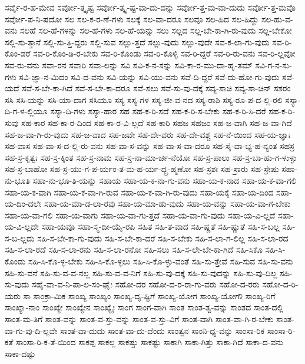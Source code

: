 {ಸರ್ವೈ-ರ-ಹ-ಮೇವ
ಸರ್ವೋ-ತ್ಕೃಷ್ಟ
ಸರ್ವೋ-ತ್ಕೃ-ಷ್ಟ-ವಾ-ದು-ದನ್ನು
ಸರ್ವೋ-ತ್ತ-ಮ-ವಾ-ದುದು
ಸರ್ವೋ-ತ್ತ-ಮವೊ
ಸರ್ವೋ-ಪ-ನಿ-ಷದೋ
ಸಲ
ಸಲ-ಕ-ರ-ಣೆ-ಗಳು
ಸಲಕ್ಕೆ
ಸಲ-ವಾ-ದರೂ
ಸಲವೂ
ಸಲ-ಹಿದ
ಸಲ-ಹಿದ್ದು
ಸಲ-ಹು-ವ-ವನು
ಸಲಹೆ
ಸಲ-ಹೆ-ಗಳನ್ನು
ಸಲ-ಹೆ-ಗಳು
ಸಲ-ಹೆ-ಯನ್ನು
ಸಲು
ಸಲ್ಲದ
ಸಲ್ಲ-ಬೇ-ಕಾ-ಗಿ-ರು-ವುದು
ಸಲ್ಲ-ಬೇಕೋ
ಸಲ್ಲಿ-ಸು-ತ್ತಾನೆ
ಸಲ್ಲಿ-ಸು-ತ್ತಿ-ದ್ದರು
ಸಲ್ಲಿ-ಸುವ
ಸಲ್ಲು-ತ್ತದೆ
ಸಲ್ಲು-ವುದು
ಸಲ್ಲು-ವುದೇ
ಸವ-ಕ-ಲಾ-ಗು-ವುದು
ಸವ-ರಿ-ಕೊಂ-ಡರೆ
ಸವ-ರಿ-ಕೊಂ-ಡಿ-ರ-ಬೇಕು
ಸವ-ರಿ-ಕೊಂಡು
ಸವ-ರಿ-ಕೊಳ್ಳಿ
ಸವ-ರಿ-ದ್ದರೆ
ಸವ-ರಿ-ರು-ವನು
ಸವ-ರಿ-ಲ್ಲವೋ
ಸವ-ರು-ವನು
ಸವಾ-ರನ
ಸವಾರಿ
ಸವಾ-ಲನ್ನು
ಸವಿ
ಸವಿ-ಕ-ನ-ಸನ್ನು
ಸವಿ-ಕಾ-ರ-ಮು-ದಾ-ಹೃ-ತಮ್
ಸವಿ-ಗ-ನ-ಸು-ಗಳು
ಸವಿ-ಜ್ಞಾ-ನ-ಮಿದಂ
ಸವಿ-ದ-ವನು
ಸವಿ-ಯನ್ನು
ಸವಿ-ಯು-ವನು
ಸವೆ-ದಿ-ದ್ದರೆ
ಸವೆ-ದು-ಹೋ-ಗು-ವುದು
ಸವೆ-ಯದೆ
ಸವೆ-ಸ-ಬೇ-ಕಾ-ಗಿದೆ
ಸವೆ-ಸ-ಬೇ-ಕಾ-ದರೂ
ಸವೆ-ಸಲು
ಸವೆ-ಸು-ವು-ದಕ್ಕೆ
ಸವ್ಯ-ಸಾಚಿ
ಸವ್ಯ-ಸಾ-ಚಿನ್
ಸಶರಂ
ಸಸಿ
ಸಸಿ-ಯನ್ನು
ಸಸಿ-ಯಾ-ದಾಗ
ಸಸಿಯೂ
ಸಸ್ಯ
ಸಸ್ಯ-ಗಳ
ಸಸ್ಯ-ಜೀ-ವ-ನದ
ಸಸ್ಯ-ರಾಶಿ
ಸಸ್ಯ-ರೂ-ಪ-ದ-ಲ್ಲಿ-ರಲಿ
ಸಸ್ಯಾ-ದಿ-ಗ-ಳ-ಲ್ಲಿಯೂ
ಸಸ್ಯಾ-ದಿ-ಗಳು
ಸಸ್ಯಾ-ಹಾರ
ಸಹ
ಸಹ-ಕ-ರಿ-ಸದೆ
ಸಹ-ಕ-ರಿ-ಸ-ಬೇಕು
ಸಹ-ಕ-ರಿ-ಸಿ-ದರೆ
ಸಹ-ಕ-ರಿ-ಸುವು
ಸಹ-ಕಾರ
ಸಹ-ಕಾ-ರ-ದಿಂದ
ಸಹ-ಕಾ-ರ-ವಿ-ಲ್ಲದೆ
ಸಹ-ಕಾರಿ
ಸಹಜ
ಸಹಜಂ
ಸಹ-ಜ-ವಾಗಿ
ಸಹ-ಜ-ವಾ-ಗಿದೆ
ಸಹ-ಜ-ವಾ-ಗಿ-ರು-ವುದು
ಸಹ-ಜ-ವಾದ
ಸಹ-ಜವೇ
ಸಹ-ದೇ-ವರು
ಸಹ-ದೇ-ವಶ್ಚ
ಸಹ-ನೆ-ಯಿಂದ
ಸಹ-ಯ-ಜ್ಞಾಃ
ಸಹ-ವಾಸ
ಸಹ-ವಾ-ಸ-ದ-ಲ್ಲಿ-ರು-ವನು
ಸಹ-ವಾ-ಸ-ವನ್ನು
ಸಹ-ವಾ-ಸ-ವಾ-ದರೂ
ಸಹ-ಸೈ-ವಾ-ಭ್ಯ-ಹ-ನ್ಯಂತ
ಸಹಸ್ರ
ಸಹ-ಸ್ರ-ಕೃತ್ವಃ
ಸಹ-ಸ್ರ-ಕ್ಕಿಂತ
ಸಹ-ಸ್ರ-ನಾಮ
ಸಹ-ಸ್ರ-ನಾ-ಮಾ-ರ್ಚ-ನೆಯೋ
ಸಹ-ಸ್ರ-ಪಾಲು
ಸಹ-ಸ್ರ-ಬಾ-ಹು-ಗ-ಳುಳ್ಳು
ಸಹ-ಸ್ರ-ಬಾಹೋ
ಸಹ-ಸ್ರ-ಯು-ಗ-ಪ-ರ್ಯಂ-ತ-ಮ-ಹ-ರ್ಯ-ದ್ಬ್ರ-ಹ್ಮಣೋ
ಸಹ-ಸ್ರಶಃ
ಸಹ-ಸ್ರಾರು
ಸಹ-ಸ್ರೇಷು
ಸಹಾ-ನು-ಭೂತಿ
ಸಹಾ-ನು-ಭೂ-ತಿ-ಯನ್ನು
ಸಹಾಯ
ಸಹಾ-ಯ-ಕ-ನಾ-ಗು-ವನು
ಸಹಾ-ಯ-ಕ-ನಾದ
ಸಹಾ-ಯ-ಕ-ವಾ-ಗಲಿ
ಸಹಾ-ಯ-ಕ-ವಾಗಿ
ಸಹಾ-ಯ-ಕ-ವಾ-ಗಿ-ರುವ
ಸಹಾ-ಯ-ಕ-ವಾ-ಗಿ-ರು-ವುದು
ಸಹಾ-ಯಕ್ಕೆ
ಸಹಾ-ಯ-ದಿಂದ
ಸಹಾ-ಯ-ದಿಂ-ದಲೇ
ಸಹಾ-ಯ-ಮಾ-ಡ-ಲಾ-ರವು
ಸಹಾ-ಯ-ಮಾ-ಡು-ವುದು
ಸಹಾ-ಯ-ವನ್ನು
ಸಹಾ-ಯ-ವಾ-ಗ-ಬೇಕು
ಸಹಾ-ಯ-ವಾ-ಗಲಿ
ಸಹಾ-ಯ-ವಾಗು
ಸಹಾ-ಯ-ವಾ-ಗು-ತ್ತದೆ
ಸಹಾ-ಯ-ವಾ-ಗು-ವುದು
ಸಹಾ-ಯ-ವಿ-ಲ್ಲದೆ
ಸಹಾ-ಯ-ವಿ-ಲ್ಲದೇ
ಸಹಾ-ಯವೂ
ಸಹಾ-ಸ್ಮ-ದೀ-ಯೈ-ರಪಿ
ಸಹಿತ
ಸಹಿ-ತ-ವಾದ
ಸಹಿ-ಷ್ಣತೆ
ಸಹಿ-ಷ್ಣುತೆ
ಸಹಿ-ಸ-ಬಲ್ಲ
ಸಹಿ-ಸ-ಬ-ಲ್ಲದು
ಸಹಿ-ಸ-ಬೇ-ಕಾ-ಗು-ವುದು
ಸಹಿ-ಸ-ಬೇ-ಕಾ-ದರೆ
ಸಹಿ-ಸ-ಬೇಕು
ಸಹಿ-ಸ-ಲಾ-ಗ-ಲಿಲ್ಲ
ಸಹಿ-ಸ-ಲಾ-ರದ
ಸಹಿ-ಸ-ಲಾ-ರದೆ
ಸಹಿ-ಸ-ಲಾ-ರನು
ಸಹಿ-ಸ-ಲಾ-ರನೋ
ಸಹಿ-ಸಲು
ಸಹಿ-ಸ-ಲೇ-ಬೇ-ಕಾ-ಗಿದೆ
ಸಹಿ-ಸಿಕೊ
ಸಹಿ-ಸಿ-ಕೊಂಡು
ಸಹಿ-ಸಿ-ಕೊ-ಳ್ಳ-ಬೇಕು
ಸಹಿ-ಸಿ-ಕೊ-ಳ್ಳಲು
ಸಹಿ-ಸಿ-ಕೊ-ಳ್ಳು-ವಂತೆ
ಸಹಿ-ಸು-ತ್ತೇವೆ
ಸಹಿ-ಸುವ
ಸಹಿ-ಸು-ವನು
ಸಹಿ-ಸು-ವನೆ
ಸಹಿ-ಸು-ವ-ವ-ನಲ್ಲ
ಸಹಿ-ಸು-ವ-ವ-ನಿಗೆ
ಸಹಿ-ಸು-ವು-ದಕ್ಕೆ
ಸಹಿ-ಸು-ವುದನ್ನು
ಸಹಿ-ಸು-ವು-ದಿಲ್ಲ
ಸಹಿ-ಸು-ವುದು
ಸಹೈ-ವಾ-ವ-ನಿ-ಪಾ-ಲ-ಸಂ-ಘೈಃ
ಸಹೋ-ದರ
ಸಹೋ-ದ-ರ-ರಾ-ಗು-ವರು
ಸಹೋ-ದ-ರರು
ಸಹೋ-ದ-ರಿ-ಯರು
ಸಾ
ಸಾಂಕ್ರಾ-ಮಿಕ
ಸಾಂಖ್ಯ
ಸಾಂಖ್ಯಂ
ಸಾಂಖ್ಯ-ದೃ-ಷ್ಟಿಗೆ
ಸಾಂಖ್ಯ-ಯೋಗ
ಸಾಂಖ್ಯ-ಯೋಗೌ
ಸಾಂಖ್ಯ-ರಿಗೆ
ಸಾಂಖ್ಯಾ-ನಾಂ
ಸಾಂಖ್ಯೇ
ಸಾಂಖ್ಯೇನ
ಸಾಂಖ್ಯೈಃ
ಸಾಂಗ
ಸಾಂಗ-ವಾಗಿ
ಸಾಂತ
ಸಾಂತ-ತ್ವ-ವನ್ನು
ಸಾಂತದ
ಸಾಂತ-ದಲ್ಲಿ
ಸಾಂತ-ಮ-ತಿಗೆ
ಸಾಂತ-ವನ್ನು
ಸಾಂತ-ವ-ಸ್ತು-ವನ್ನು
ಸಾಂತ-ವ-ಸ್ತು-ವಿಗೆ
ಸಾಂತ-ವಾಗಿ
ಸಾಂತ-ವಾ-ಗಿ-ರ-ಬೇಕು
ಸಾಂತ-ವಾ-ಗು-ವು-ದಿ-ಲ್ಲವೇ
ಸಾಂತ-ವಾ-ದುದು
ಸಾಂತ-ವಾ-ದು-ದೆಂದು
ಸಾಂತ್ವನ
ಸಾಂನಿ-ಧ್ಯ-ವನ್ನು
ಸಾಂಸಾ-ರಿಕ
ಸಾಂಸಾ-ರಿ-ಕತೆ
ಸಾಂಸಾ-ರಿ-ಕ-ತೆ-ಯಿಂದ
ಸಾಕಪ್ಪ
ಸಾಕಲ್ಲ
ಸಾಕಷ್ಚು
ಸಾಕಷ್ಟು
ಸಾಕಾಗಿ
ಸಾಕಾ-ಗಿತ್ತು
ಸಾಕಾ-ಗಿದೆ
ಸಾಕಾ-ದ-ವನು
ಸಾಕಾ-ದಷ್ಟು
}
